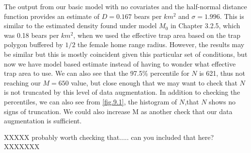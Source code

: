 The output from our basic model with no covariates and the half-normal
distance function provides an estimate of $D = 0.167$ bears per $km^2$
and $\sigma = 1.996$.  This is similar to the estimated density found
under model $M_0$ in Chapter 3.2.5, which was 0.18 bears per $km^2$, 
when we used the effective trap area based on the trap polygon 
buffered by $1/2$ the female home range radius.
However, the results may be similar but this is mostly coincident given this particular set of 
conditions, but now we have model based estimate instead of having to wonder
what effective trap area to use.    
We can also see that the 97.5\%
percentile for $N$ is 621, thus not reaching our $M=650$ value, but
close enough that we may want to check that $N$ is not truncated by
this level of data augmentation.  In addition to checking the percentiles, we can also see from \ref{fig.9.1}, the histogram of $N$,that $N$ shows no signs of truncation.  We could also increase
M as another check that our data augmentation is sufficient.   


XXXXX probably worth checking that..... can you included that here? XXXXXXX

